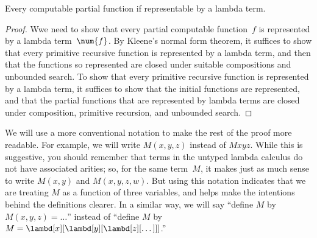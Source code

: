 \documentclass[../../../include/open-logic-section]{subfiles}
\begin{document}

\begin{thm}
Every computable partial function if representable by a lambda term.
\end{thm}

\begin{proof}
Wwe need to show that every partial computable function~$f$ is
represented by a lambda term~$\num{f}$. By Kleene's normal form
theorem, it suffices to show that every primitive recursive function
is represented by a lambda term, and then that the functions so
represented are closed under suitable compositions and unbounded
search. To show that every primitive recursive function is represented
by a lambda term, it suffices to show that the initial functions are
represented, and that the partial functions that are represented by
lambda terms are closed under composition, primitive recursion, and
unbounded search.
\end{proof}

We will use a more conventional notation to make the rest of the proof
more readable. For example, we will write $M(x, y, z)$ instead of
$Mxyz$. While this is suggestive, you should remember that terms in
the untyped lambda calculus do not have associated arities; so, for
the same term~$M$, it makes just as much sense to write $M(x,y)$ and
$M(x,y,z,w)$. But using this notation indicates that we are treating
$M$ as a function of three variables, and helps make the intentions
behind the definitions clearer. In a similar way, we will say ``define
$M$ by $M(x,y,z) = \dots$'' instead of ``define $M$ by $M =
\lambd[x][\lambd[y][\lambd[z][\dots]]]$.''
\end{document}
